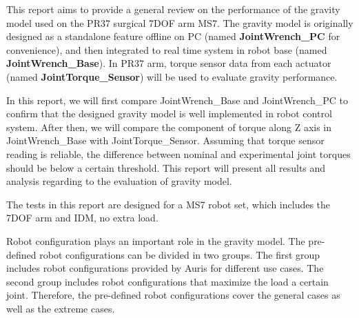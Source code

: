 This report aims to provide a general review on the performance of the gravity model used on the PR37 surgical 7DOF arm MS7. The gravity model is originally designed as a standalone feature offline on PC (named \textbf{JointWrench\_PC} for convenience), and then integrated to real time system in robot base (named \textbf{JointWrench\_Base}). In PR37 arm, torque sensor data from each actuator (named \textbf{JointTorque\_Sensor}) will be used to evaluate gravity performance.

In this report, we will first compare JointWrench\_Base and JointWrench\_PC to confirm that the designed gravity model is well implemented in robot control system. After then, we will compare the component of torque along Z axis in JointWrench\_Base with JointTorque\_Sensor. Assuming that torque sensor reading is reliable, the difference between nominal and experimental joint torques should be below a certain threshold. This report will present all results and analysis regarding to the evaluation of gravity model. 

The tests in this report are designed for a MS7 robot set, which includes the 7DOF arm and IDM, no extra load. 

Robot configuration plays an important role in the gravity model. The pre-defined robot configurations can be divided in two groups. The first group includes robot configurations provided by Auris for different use cases. The second group includes robot configurations that maximize the load a certain joint. Therefore, the pre-defined robot configurations cover the general cases as well as the extreme cases. 

